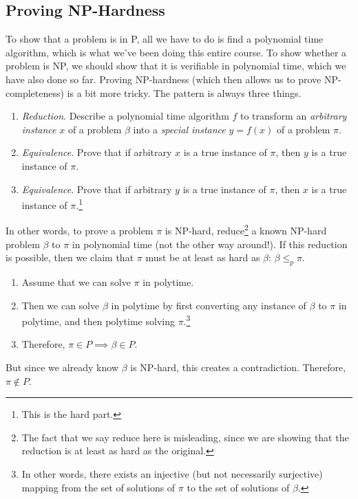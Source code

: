 \subsection{Proving NP-Hardness}

  To show that a problem is in P, all we have to do is find a polynomial time algorithm, which is what we've been doing this entire course. To show whether a problem is NP, we should show that it is verifiable in polynomial time, which we have also done so far. Proving NP-hardness (which then allows us to prove NP-completeness) is a bit more tricky. The pattern is always three things. 
  \begin{enumerate}
    \item \textit{Reduction}. Describe a polynomial time algorithm $f$ to transform an \textit{arbitrary instance} $x$ of a problem $\beta$ into a \textit{special instance} $y = f(x)$ of a problem $\pi$. 
    \item \textit{Equivalence}. Prove that if arbitrary $x$ is a true instance of $\pi$, then $y$ is a true instance of $\pi$. 
    \item \textit{Equivalence}. Prove that if arbitrary $y$ is a true instance of $\pi$, then $x$ is a true instance of $\pi$.\footnote{This is the hard part.} 
  \end{enumerate}

  \begin{definition}[Reduction]
    \label{def:reduction}
    In other words, to prove a problem $\pi$ is NP-hard, reduce\footnote{The fact that we say reduce here is misleading, since we are showing that the reduction is at least as hard as the original.} a known NP-hard problem $\beta$ to $\pi$ in polynomial time (not the other way around!). If this reduction is possible, then we claim that $\pi$ must be at least as hard as $\beta$: $\beta \leq_p \pi$. 
    \begin{enumerate}
      \item Assume that we can solve $\pi$ in polytime. 
      \item Then we can solve $\beta$ in polytime by first converting any instance of $\beta$ to $\pi$ in polytime, and then polytime solving $\pi$.\footnote{In other words, there exists an injective (but not necessarily surjective) mapping from the set of solutions of $\pi$ to the set of solutions of $\beta$. }
      \item Therefore, $\pi \in P \implies \beta \in P$. 
    \end{enumerate}
    But since we already know $\beta$ is NP-hard, this creates a contradiction. Therefore, $\pi \not\in P$. 
  \end{definition}


